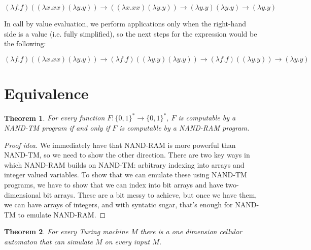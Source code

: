 \documentclass[11pt]{article}
\newtheorem{theorem}{Theorem}
\theoremstyle{definition}
\theoremstyle{remark}
\begin{document}
$$(\lambda f.f)((\lambda x. x x)(\lambda y.y)) \to ((\lambda x. x x)(\lambda y.y)) \to (\lambda y.y) (\lambda y.y) \to (\lambda y.y)$$ 

In call by value evaluation, we perform applications only when the right-hand side is a value (i.e. fully simplified), so the next steps for the expression would be the following: 

$$(\lambda f.f)((\lambda x. x x)(\lambda y.y)) \to (\lambda f.f)((\lambda y.y) (\lambda y.y)) \to (\lambda f.f)((\lambda y.y)) \to (\lambda y.y)$$

\section{Equivalence}

\begin{theorem}
For every function $F:\{0,1\}^* \rightarrow \{0,1\}^*$, $F$ is computable by a NAND-TM program if and only if $F$ is computable by a NAND-RAM program.
\end{theorem}
\begin{proof}[Proof idea]
We immediately have that NAND-RAM is more powerful than NAND-TM, so we need to show the other direction. There are two key ways in which NAND-RAM builds on NAND-TM: arbitrary indexing into arrays and integer valued variables. To show that we can emulate these using NAND-TM programs, we have to show that we can index into bit arrays and have two-dimensional bit arrays. These are a bit messy to achieve, but once we have them, we can have arrays of integers, and with syntatic sugar, that's enough for NAND-TM to emulate NAND-RAM.
\end{proof}


\begin{theorem}
For every Turing machine $M$ there is a one dimension cellular automaton that can simulate $M$ on every input $M$.
\end{theorem}
\end{document}

